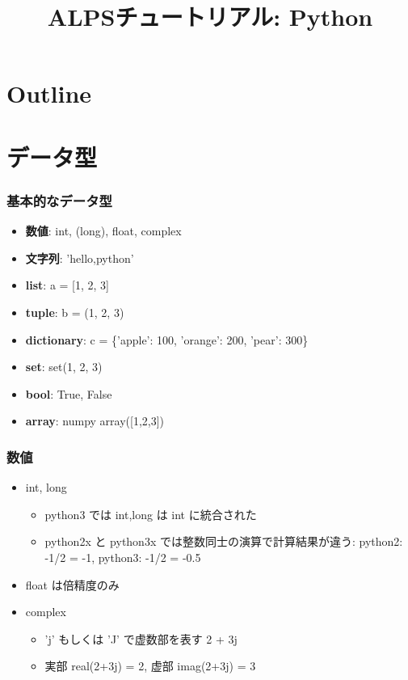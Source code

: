 
\title{ALPSチュートリアル: Python}



\begin{frame}
  \titlepage
\end{frame}

\section*{Outline}
\begin{frame}
  \tableofcontents
\end{frame}

\section{データ型}
\begin{frame}[t]
\frametitle{基本的なデータ型}

\begin{itemize}
   \item \textbf{数値}: int, (long), float, complex
   \item \textbf{文字列}: 'hello,python'
   \item \textbf{list}: a = [1, 2, 3]
   \item \textbf{tuple}: b = (1, 2, 3)
   \item \textbf{dictionary}: c = \{'apple': 100, 'orange': 200, 'pear': 300\}
   \item \textbf{set}: set(1, 2, 3)
   \item \textbf{bool}: True, False
   \item \textbf{array}: numpy array([1,2,3])
\end{itemize}

\end{frame}

\begin{frame}[t,fragile]
\frametitle{数値}

\begin{itemize}
  \item int, long
    \begin{itemize}
    \item python3 では int,long は int に統合された
    \item python2x と python3x では整数同士の演算で計算結果が違う:
          python2:  -1/2 = -1, python3: -1/2 = -0.5
    \end{itemize}
  \item float は倍精度のみ
  \item complex
    \begin{itemize}
       \item 'j' もしくは 'J' で虚数部を表す 2 + 3j
       \item 実部 real(2+3j) = 2, 虚部 imag(2+3j) = 3  
    \end{itemize}
\end{itemize}

\end{frame}

